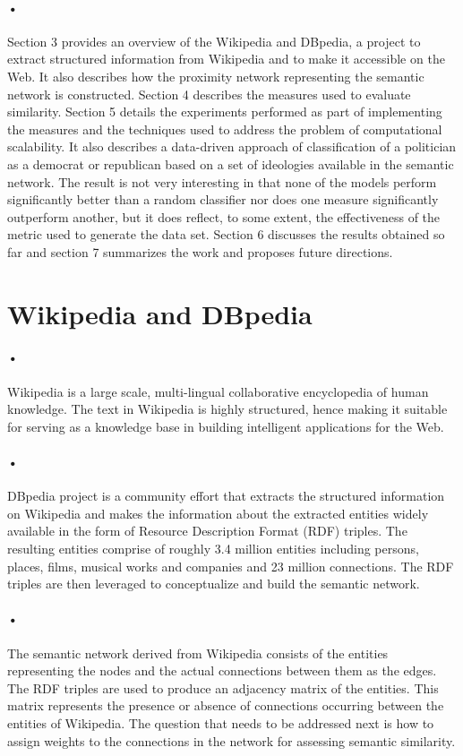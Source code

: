 \documentclass[12pt]{article}
\begin{document}
\paragraph{•}
Section 3 provides an overview of the Wikipedia and DBpedia, a project to extract structured information from Wikipedia and to make it accessible on the Web. It also describes how the proximity network representing the semantic network is constructed. Section 4 describes the measures used to evaluate similarity. Section 5 details the experiments performed as part of implementing the measures and the techniques used to address the problem of computational scalability. It also describes a data-driven approach of classification of a politician as a democrat or republican based on a set of ideologies available in the semantic network. The result is not very interesting in that none of the models perform significantly better than a random classifier nor does one measure significantly outperform another, but it does reflect, to some extent, the effectiveness of the metric used to generate the data set. Section 6 discusses the results obtained so far and section 7 summarizes the work and proposes future directions.


\section{Wikipedia and DBpedia}
\paragraph{•}
Wikipedia is a large scale, multi-lingual collaborative encyclopedia of human knowledge. The text in Wikipedia is highly structured, hence making it suitable for serving as a knowledge base in building intelligent applications for the Web. 

\paragraph{•}
DBpedia project is a community effort that extracts the structured information on Wikipedia and makes the information about the extracted entities widely available in the form of Resource Description Format (RDF) triples. The resulting entities comprise of roughly 3.4 million entities including persons, places, films, musical works and companies and 23 million connections. The RDF triples are then leveraged to conceptualize and build the semantic network. 

\paragraph{•}
The semantic network derived from Wikipedia consists of the entities representing the nodes and the actual connections between them as the edges. The RDF triples are used to produce an adjacency matrix of the entities. This matrix represents the presence or absence of connections occurring between the entities of Wikipedia. The question that needs to be addressed next is how to assign weights to the connections in the network for assessing semantic similarity. 
\end{document}
